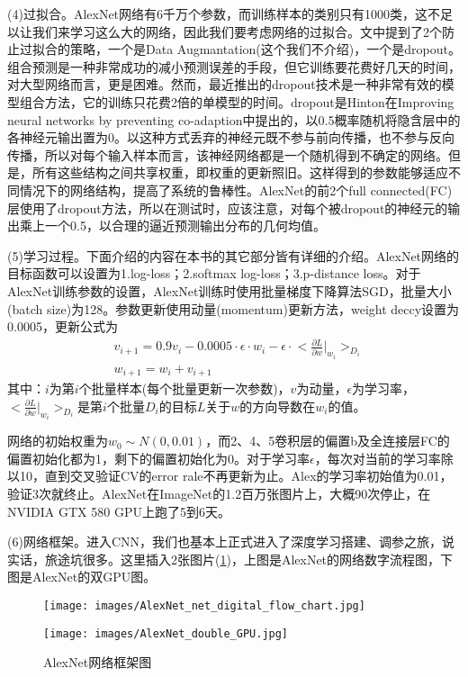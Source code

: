         \par
        (4)过拟合。AlexNet网络有6千万个参数，而训练样本的类别只有1000类，这不足以让我们来学习这么大的网络，因此我们要考虑网络的过拟合。文中提到了2个防止过拟合的策略，一个是Data Augmantation(这个我们不介绍)，一个是dropout。组合预测是一种非常成功的减小预测误差的手段，但它训练要花费好几天的时间，对大型网络而言，更是困难。然而，最近推出的dropout技术是一种非常有效的模型组合方法，它的训练只花费2倍的单模型的时间。dropout是Hinton在Improving neural networks by preventing co-adaption中提出的，以0.5概率随机将隐含层中的各神经元输出置为0。以这种方式丢弃的神经元既不参与前向传播，也不参与反向传播，所以对每个输入样本而言，该神经网络都是一个随机得到不确定的网络。但是，所有这些结构之间共享权重，即权重的更新照旧。这样得到的参数能够适应不同情况下的网络结构，提高了系统的鲁棒性。AlexNet的前2个full connected(FC)层使用了dropout方法，所以在测试时，应该注意，对每个被dropout的神经元的输出乘上一个0.5，以合理的逼近预测输出分布的几何均值。
        \par
        (5)学习过程。下面介绍的内容在本书的其它部分皆有详细的介绍。AlexNet网络的目标函数可以设置为1.log-loss；2.softmax log-loss；3.p-distance loss。对于AlexNet训练参数的设置，AlexNet训练时使用批量梯度下降算法SGD，批量大小(batch size)为128。参数更新使用动量(momentum)更新方法，weight deccy设置为0.0005，更新公式为
        \begin{align*}
        & v_{i+1} = 0.9v_i-0.0005\cdot\epsilon\cdot w_i - \epsilon\cdot\Big<\frac{\partial L}{\partial w}\Big |_{w_i}\Big>_{D_i}\\
        & w_{i+1} = w_i+v_{i+1}
        \end{align*}
        其中：$i$为第$i$个批量样本(每个批量更新一次参数)，$v$为动量，$\epsilon$为学习率，$\Big<\frac{\partial L}{\partial w}\Big |_{w_i}\Big>_{D_i}$是第$i$个批量$D_i$的目标$L$关于$w$的方向导数在$w_i$的值。
        \par
        网络的初始权重为$w_0\sim N(0,0.01)$，而2、4、5卷积层的偏置b及全连接层FC的偏置初始化都为1，剩下的偏置初始化为0。对于学习率$\epsilon$，每次对当前的学习率除以10，直到交叉验证CV的error rale不再更新为止。Alex的学习率初始值为0.01，验证3次就终止。AlexNet在ImageNet的1.2百万张图片上，大概90次停止，在NVIDIA GTX 580 GPU上跑了5到6天。
        \par
        (6)网络框架。进入CNN，我们也基本上正式进入了深度学习搭建、调参之旅，说实话，旅途坑很多。这里插入2张图片(\ref{fig:AlexNet网络框架图})，上图是AlexNet的网络数字流程图，下图是AlexNet的双GPU图。
        \begin{figure}[H]
          \centering
          \begin{varwidth}[t]{\textwidth}
            \vspace{0pt}
            \texttt{[image: images/AlexNet\_net\_digital\_flow\_chart.jpg]}
          \end{varwidth}
          \qquad
          \begin{varwidth}[t]{\textwidth}
            \vspace{0pt}
            \texttt{[image: images/AlexNet\_double\_GPU.jpg]}
          \end{varwidth}
          \caption{AlexNet网络框架图}
          \label{fig:AlexNet网络框架图}
        \end{figure}
